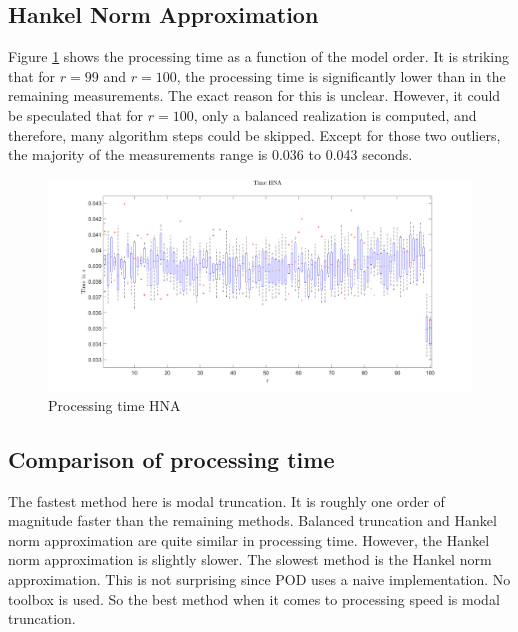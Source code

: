 \subsection{Hankel Norm Approximation}
Figure \ref{FIG-T-HNA} shows the processing time as a function of the model order.
It is striking that for \(r = 99\) and \(r = 100\), the processing time is significantly lower than in the remaining measurements.
The exact reason for this is unclear. However, it could be speculated that for \(r=100\), only a balanced realization is computed, and therefore, many algorithm steps could be skipped.
Except for those two outliers, the majority of the measurements range is 0.036 to 0.043 seconds.
\begin{figure}[H]
\centering
\includegraphics[width=\textwidth]{images/time/HNA}
\caption{Processing time HNA}
\label{FIG-T-HNA}
\end{figure}

\subsection{Comparison of processing time}
The fastest method here is modal truncation.
It is roughly one order of magnitude faster than the remaining methods.
Balanced truncation and Hankel norm approximation are quite similar in processing time. However, the Hankel norm approximation is slightly slower.
The slowest method is the Hankel norm approximation.
This is not surprising since POD uses a naive implementation. No toolbox is used.
So the best method when it comes to processing speed is modal truncation.










